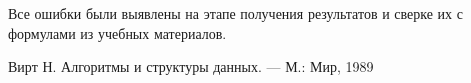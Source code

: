 \documentclass[a4paper,12pt,titlepage,finall]{article}
\begin{document}
Все ошибки были выявлены на этапе получения результатов и сверке их с формулами из учебных материалов.


\newpage
\begin{thebibliography}{1}
        Вирт Н. Алгоритмы и структуры данных. — М.: Мир, 1989
\end{thebibliography}
\end{document}
